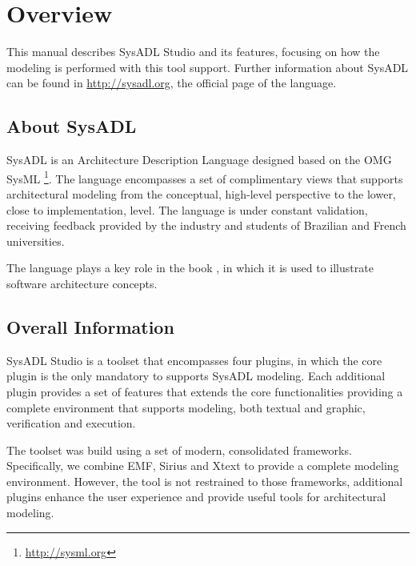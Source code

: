 \chapter{Overview}
This manual describes SysADL Studio and its features, focusing on how the modeling is performed with this tool support. Further information about SysADL can be found in \url{http://sysadl.org}, the official page of the language.

\section{About SysADL}
SysADL is an Architecture Description Language designed based on the OMG SysML \footnote{\url{http://sysml.org}}. The language encompasses a set of complimentary views that supports architectural modeling from the conceptual, high-level perspective to the lower, close to implementation, level. The language is under constant validation, receiving feedback provided by the industry and students of Brazilian and French universities.

The language plays a key role in the book \cite{}, in which it is used to illustrate software architecture concepts.

\section{Overall Information}
SysADL Studio is a toolset that encompasses four plugins, in which the core plugin is the only mandatory to supports SysADL modeling. Each additional plugin provides a set of features that extends the core functionalities providing a complete environment that supports modeling, both textual and graphic, verification and execution.

The toolset was build using a set of modern, consolidated frameworks. Specifically, we combine EMF, Sirius and Xtext to provide a complete modeling environment. However, the tool is not restrained to those frameworks, additional plugins enhance the user experience and provide useful tools for architectural modeling.

